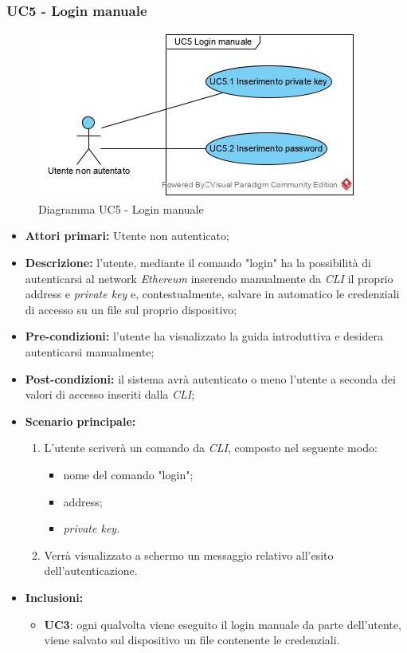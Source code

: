 \subsubsection{UC5 - Login manuale}
\begin{figure}[h]
	\centering
	\includegraphics[width=\linewidth]{res/img/UC5.jpg}
	\caption{Diagramma UC5 - Login manuale}
\end{figure}
\begin{itemize}
	\item \textbf{Attori primari:} Utente non autenticato;
	\item \textbf{Descrizione:} l'utente, mediante il comando "login" ha la possibilità di autenticarsi al network \textit{Ethereum\glo} inserendo manualmente da \textit{CLI\glo} il proprio address e \textit{private key\glos} e, contestualmente, salvare in automatico le credenziali di accesso su un file sul proprio dispositivo;
	\item \textbf{Pre-condizioni:} l'utente ha visualizzato la guida introduttiva e desidera autenticarsi manualmente;
	\item \textbf{Post-condizioni:} il sistema avrà autenticato o meno l'utente a seconda dei valori di accesso inseriti dalla \textit{CLI\glos};
	\item \textbf{Scenario principale:}
	\begin{enumerate}
		\item L'utente scriverà un comando da \textit{CLI\glos}, composto nel seguente modo:
		\begin{itemize}
			\item nome del comando "login";
			\item address;
			\item \textit{private key\glos}.
		\end{itemize}
		\item Verrà visualizzato a schermo un messaggio relativo all'esito dell'autenticazione.
	\end{enumerate}
	\item \textbf{Inclusioni:}
		\begin{itemize}
		\item\textbf{UC3}: ogni qualvolta viene eseguito il login manuale da parte dell'utente, viene salvato sul dispositivo un file contenente le credenziali.
	\end{itemize}
\end{itemize}
